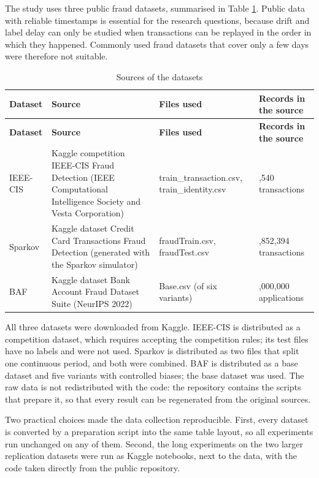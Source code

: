 The study uses three public fraud datasets, summarised in Table \ref{tab:sources}. Public data with reliable timestamps is essential for the research questions, because drift and label delay can only be studied when transactions can be replayed in the order in which they happened. Commonly used fraud datasets that cover only a few days \cite{dang2021,mienye2023} were therefore not suitable.

{\footnotesize
\begin{longtable}{>{\raggedright\arraybackslash}p{}>{\raggedright\arraybackslash}p{}>{\raggedright\arraybackslash}p{}>{\raggedright\arraybackslash}p{}}
\caption{Sources of the datasets}\label{tab:sources}\\
\toprule
\textbf{Dataset} & \textbf{Source} & \textbf{Files used} & \textbf{Records in the source} \\
\midrule
\endfirsthead
\toprule
\textbf{Dataset} & \textbf{Source} & \textbf{Files used} & \textbf{Records in the source} \\
\midrule
\endhead
IEEE-CIS & Kaggle competition IEEE-CIS Fraud Detection (IEEE Computational Intelligence Society and Vesta Corporation) & train\_transaction.csv, train\_identity.csv & 590,540 transactions \\ \midrule
Sparkov & Kaggle dataset Credit Card Transactions Fraud Detection (generated with the Sparkov simulator) & fraudTrain.csv, fraudTest.csv & 1,852,394 transactions \\ \midrule
BAF & Kaggle dataset Bank Account Fraud Dataset Suite (NeurIPS 2022) & Base.csv (of six variants) & 1,000,000 applications \\ \bottomrule
\end{longtable}
}

All three datasets were downloaded from Kaggle. IEEE-CIS is distributed as a competition dataset, which requires accepting the competition rules; its test files have no labels and were not used. Sparkov is distributed as two files that split one continuous period, and both were combined. BAF is distributed as a base dataset and five variants with controlled biases; the base dataset was used. The raw data is not redistributed with the code: the repository contains the scripts that prepare it, so that every result can be regenerated from the original sources.

Two practical choices made the data collection reproducible. First, every dataset is converted by a preparation script into the same table layout, so all experiments run unchanged on any of them. Second, the long experiments on the two larger replication datasets were run as Kaggle notebooks, next to the data, with the code taken directly from the public repository.

